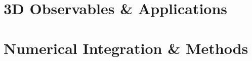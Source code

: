 
\chapter{3D Observables \& Applications}\label{ch:observables}

\newpage

\newpage

\newpage



\chapter{Numerical Integration \& Methods}\label{ch:numerical}

\newpage

\newpage

\newpage



\backmatter

\printbibliography[title=References]



